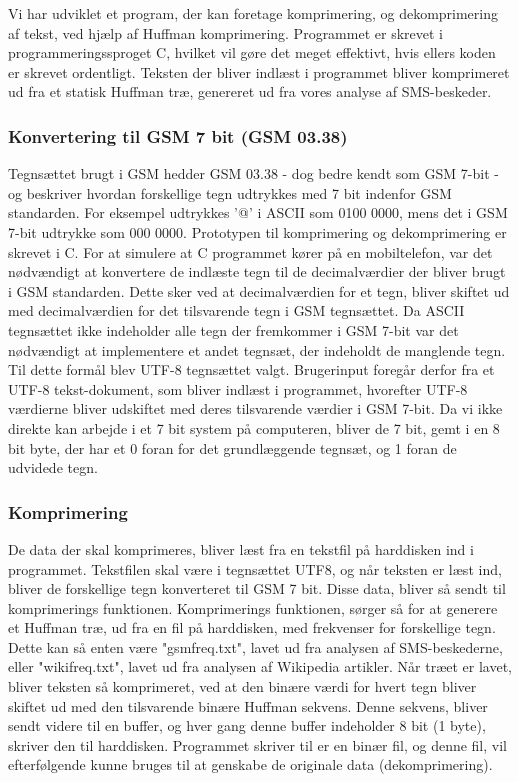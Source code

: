 Vi har udviklet et program, der kan foretage komprimering, og dekomprimering af tekst, ved hjælp af Huffman komprimering. Programmet er skrevet i programmeringssproget C, hvilket vil gøre det meget effektivt, hvis ellers koden er skrevet ordentligt.
Teksten der bliver indlæst i programmet bliver komprimeret ud fra et statisk Huffman træ, genereret ud fra vores analyse af SMS-beskeder.


\subsubsection{Konvertering til GSM 7 bit (GSM 03.38)}
Tegnsættet brugt i GSM hedder GSM 03.38 - dog bedre kendt som GSM 7-bit - og beskriver hvordan forskellige tegn udtrykkes med 7 bit indenfor GSM standarden. For eksempel udtrykkes '@' i ASCII som 0100 0000, mens det i GSM 7-bit udtrykke som 000 0000. Prototypen til komprimering og dekomprimering er skrevet i C. For at simulere at C programmet kører på en mobiltelefon, var det nødvændigt at konvertere de indlæste tegn til de decimalværdier der bliver brugt i GSM standarden. Dette sker ved at decimalværdien for et tegn, bliver skiftet ud med decimalværdien for det tilsvarende tegn i GSM tegnsættet. Da ASCII tegnsættet ikke indeholder alle tegn der fremkommer i GSM 7-bit var det nødvændigt at implementere et andet tegnsæt, der indeholdt de manglende tegn. Til dette formål blev UTF-8 tegnsættet valgt. Brugerinput foregår derfor fra et UTF-8 tekst-dokument, som bliver indlæst i programmet, hvorefter UTF-8 værdierne bliver udskiftet med deres tilsvarende værdier i GSM 7-bit. Da vi ikke direkte kan arbejde i et 7 bit system på computeren, bliver de 7 bit, gemt i en 8 bit byte, der har et 0 foran for det grundlæggende tegnsæt, og 1 foran de udvidede tegn.

\subsubsection{Komprimering}

De data der skal komprimeres, bliver læst fra en tekstfil på harddisken ind i programmet. Tekstfilen skal være i tegnsættet UTF8, og når teksten er læst ind, bliver de forskellige tegn konverteret til GSM 7 bit. Disse data, bliver så sendt til komprimerings funktionen. Komprimerings funktionen, sørger så for at generere et Huffman træ, ud fra en fil på harddisken, med frekvenser for forskellige tegn. Dette kan så enten være "gsmfreq.txt", lavet ud fra analysen af SMS-beskederne, eller "wikifreq.txt", lavet ud fra analysen af Wikipedia artikler.
Når træet er lavet, bliver teksten så komprimeret, ved at den binære værdi for hvert tegn bliver skiftet ud med den tilsvarende binære Huffman sekvens. Denne sekvens, bliver sendt videre til en buffer, og hver gang denne buffer indeholder 8 bit (1 byte), skriver den til harddisken. Programmet skriver til er en binær fil, og denne fil, vil efterfølgende kunne bruges til at genskabe de originale data (dekomprimering).

